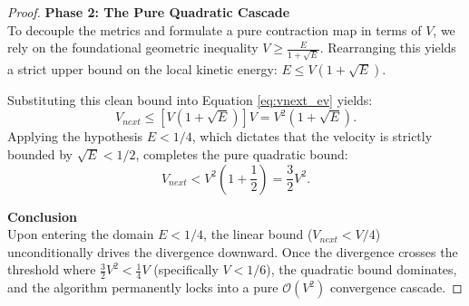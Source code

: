 \begin{proof}
\textbf{Phase 2: The Pure Quadratic Cascade} \\
To decouple the metrics and formulate a pure contraction map in terms of $V$, we rely on the foundational geometric inequality $V \ge \frac{E}{1+\sqrt{E}}$. Rearranging this yields a strict upper bound on the local kinetic energy: $E \le V(1 + \sqrt{E})$. 

Substituting this clean bound into Equation \ref{eq:vnext_ev} yields:
\begin{equation}
    V_{next} \le \left[ V(1 + \sqrt{E}) \right] V = V^2(1 + \sqrt{E}).
\end{equation}
Applying the hypothesis $E < 1/4$, which dictates that the velocity is strictly bounded by $\sqrt{E} < 1/2$, completes the pure quadratic bound:
\begin{equation}
    V_{next} < V^2 \left( 1 + \frac{1}{2} \right) = \frac{3}{2} V^2.
\end{equation}

\textbf{Conclusion} \\
Upon entering the domain $E < 1/4$, the linear bound ($V_{next} < V/4$) unconditionally drives the divergence downward. Once the divergence crosses the threshold where $\frac{3}{2}V^2 < \frac{1}{4}V$ (specifically $V < 1/6$), the quadratic bound dominates, and the algorithm permanently locks into a pure $\mathcal{O}(V^2)$ convergence cascade.
\end{proof}








